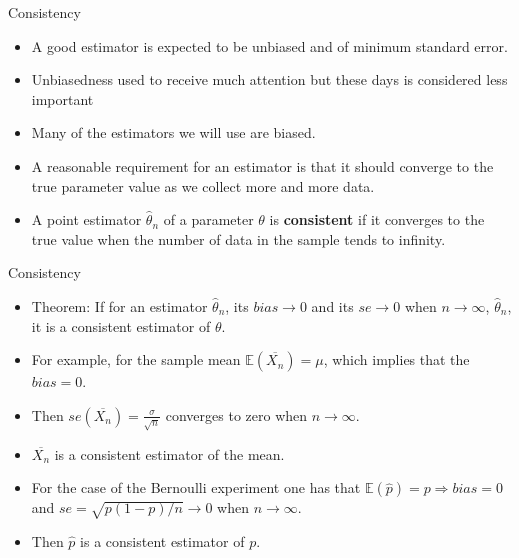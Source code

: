 \documentclass[handout]{beamer}
\begin{document}
\begin{frame}{Consistency}

\scriptsize{

\begin{itemize}
\item A good estimator is expected to be unbiased and of minimum standard error.

\item Unbiasedness used to receive much attention but these days is considered less important

\item Many of the estimators we will use are biased. 

\item A reasonable requirement for an estimator is that it should converge to the true parameter value as we collect more and more data.

\item A point estimator $\hat{\theta}_n$ of a parameter $\theta$ is \textbf{consistent}  if it converges to the true value when the number of data in the sample tends to infinity.

\end{itemize}

} 
\end{frame}



\begin{frame}{Consistency}

\scriptsize{

\begin{itemize}
\item Theorem: If for an estimator $\hat{\theta}_n$, its $bias \rightarrow 0$ and its $se \rightarrow 0$ when $n\rightarrow \infty$, $\hat{\theta}_n$, it is a consistent estimator of $\theta$.

\item For example, for the sample mean $\mathbb{E}(\overline{X_{n}})=\mu$,  which implies that the $bias =0$.
\item Then $se(\overline{X_{n}}) = \frac{\sigma}{\sqrt{n}}$  converges to zero when $n\rightarrow \infty$. 
\item  $\overline{X_{n}}$ is a consistent estimator of the mean.  

\item For the case of the Bernoulli experiment one has that  $\mathbb{E}(\hat{p})=p \Rightarrow bias=0$ and $se = \sqrt{p(1-p)/n} \rightarrow 0$ when $n\rightarrow \infty$. 

\item Then  $\hat{p}$ is a consistent estimator of $p$.


\end{itemize}

} 
\end{frame}
\end{document}
